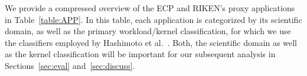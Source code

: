 We provide a compressed overview of the ECP and RIKEN's proxy applications in Table~\ref{table:APP}.
In this table, each application is categorized by its scientific domain, as well as the primary
workload/kernel classification, for which we use the classifiers employed by Hashimoto et al.~\cite{hashimoto_empirical_2017}.
Both, the scientific domain as well as the kernel classification will be important for our subsequent
analysis in Sections~\ref{sec:eval} and~\ref{sec:discuss}.
%
\begin{comment}
\begin{table}[tbp]
    \caption{\label{table:APP} Application Categorization, Compute Patterns, and main Programming Languages used; MACSio, HPL, HPCG, and BabelStream Benchmarks omitted}
    \centering\scriptsize
    \begin{tabular}{|l|l|l|l|}
        \hline \hC
        \tH{ECP}    & \tH{Scientific/Engineering Domain}    & \tH{Compute Pattern}  & \tH{Language} \\ \hline
        AMG         & Physics and Bioscience                & Stencil               & C \\ \hline \rC
        CANDLE      & Bioscience                            & Dense matrix          & Python \\ \hline
        CoMD        & Material Science/Engineering          & N-body                & C \\ \hline  \rC
        Laghos      & Physics                               & Irregular             & C++\\ \hline
        miniAMR     & Geoscience/Earthscience               & Stencil               & C \\ \hline \rC
        miniFE      & Physics                               & Irregular             & C++ \\ \hline
        miniTRI     & Math/Computer Science                 & Irregular             & C++ \\ \hline \rC
        Nekbone     & Math/Computer Science                 & Sparse matrix         & Fortan \\ \hline
        SW4lite     & Geoscience/Earthscience               & Stencil               & C \\ \hline \rC
        SWFFT       & Physics                               & FFT                   & C/Fortran \\ \hline

\end{comment}
